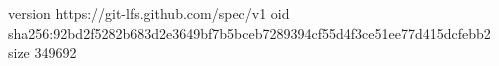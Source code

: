 version https://git-lfs.github.com/spec/v1
oid sha256:92bd2f5282b683d2e3649bf7b5bceb7289394cf55d4f3ce51ee77d415dcfebb2
size 349692
